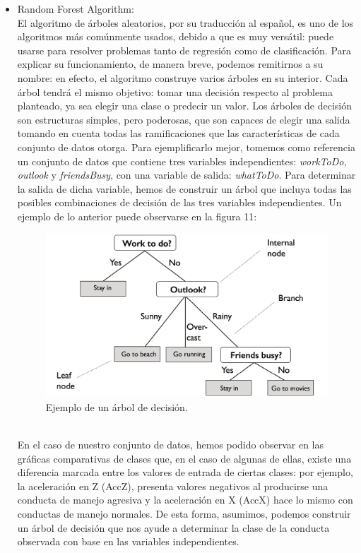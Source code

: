 \documentclass[spanish,12pt,letterpaper]{article}
\begin{document}
\begin{itemize}
    \item Random Forest Algorithm:\\
    El algoritmo de árboles aleatorios, por su traducción al español, es uno de los algoritmos más comúnmente usados, debido a que es muy versátil: puede usarse para resolver problemas tanto de regresión como de clasificación. Para explicar su funcionamiento, de manera breve, podemos remitirnos a su nombre: en efecto, el algoritmo construye varios árboles en su interior. Cada árbol tendrá el mismo objetivo: tomar una decisión respecto al problema planteado, ya sea elegir una clase o predecir un valor. Los árboles de decisión son estructuras simples, pero poderosas, que son capaces de elegir una salida tomando en cuenta todas las ramificaciones que las características de cada conjunto de datos otorga. Para ejemplificarlo mejor, tomemos como referencia un conjunto de datos que contiene tres variables independientes: \textit{workToDo, outlook} y \textit{friendsBusy}, con una variable de salida: \textit{whatToDo}. Para determinar la salida de dicha variable, hemos de construir un árbol que incluya todas las posibles combinaciones de decisión de las tres variables independientes. Un ejemplo de lo anterior puede observarse en la figura 11:
    \begin{figure}[H]
        \centering
        \includegraphics[width=1\columnwidth]{Decision_Tree_Example.jpg}
        \caption{Ejemplo de un árbol de decisión.}
        \label{fig:comand}%
    \end{figure}
    \\
    En el caso de nuestro conjunto de datos, hemos podido observar en las gráficas comparativas de clases que, en el caso de algunas de ellas, existe una diferencia marcada entre los valores de entrada de ciertas clases: por ejemplo, la aceleración en Z (AccZ), presenta valores negativos al producirse una conducta de manejo agresiva y la aceleración en X (AccX) hace lo mismo con conductas de manejo normales. De esta forma, asumimos, podemos construir un árbol de decisión que nos ayude a determinar la clase de la conducta observada con base en las variables independientes.

\end{itemize}
\end{document}
